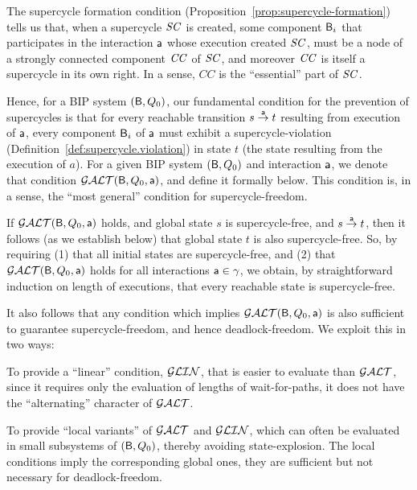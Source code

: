 
The supercycle formation condition
(Proposition~\ref{prop:supercycle-formation}) tells us that, when a
supercycle $\SC$ is created, some component $\B_i$ that participates
in the interaction $\act$ whose execution created $\SC$, must be a
node of a strongly connected component $\CC$ of $\SC$, and moreover
$\CC$ is itself a supercycle in its own right. In a sense, $CC$ is the
``essential'' part of $\SC$.

Hence, for a BIP system $(\B, Q_0)$, our fundamental condition for the
prevention of supercycles is that for every reachable transition
$s \goesto[\act] t$ resulting from execution of $\act$, every
component $\B_i$ of $\act$ must exhibit a supercycle-violation
(Definition~\ref{def:supercycle.violation}) in state $t$ (the state
resulting from the execution of $a$). For a given BIP system
$(\B, Q_0)$ and interaction $\act$, we denote that condition
$\GAO(\B, Q_0, \act)$, and define it formally below.  This condition
is, in a sense, the ``most general'' condition for supercycle-freedom.

If $\GAO(\B, Q_0, \act)$ holds, and global state $s$ is
supercycle-free, and $s \goesto[\act] t$, then it follows (as we
establish below) that global state $t$ is also supercycle-free.  So,
by requiring (1) that all initial states are supercycle-free, and (2)
that $\GAO(\B, Q_0, \act)$ holds for all interactions
$\act \in \gamma$, we obtain, by straightforward induction on length
of executions, that every reachable state is supercycle-free.

It also follows that any condition which implies $\GAO(\B, Q_0, \act)$ is also sufficient to guarantee  supercycle-freedom, and
hence deadlock-freedom. We exploit this in two ways:
\bn

\item To provide a ``linear'' condition, $\GLin$, that is easier to evaluate than $\GAO$, since it requires only the
evaluation of lengths of wait-for-paths, \ie it does not have the ``alternating'' character of $\GAO$. 

\item To provide ``local variants'' of $\GAO$ and $\GLin$,  which can often be
evaluated in small subsystems of $(\B, Q_0)$, thereby avoiding state-explosion. The local conditions imply the
corresponding global ones, \ie they are sufficient but not necessary for deadlock-freedom.

